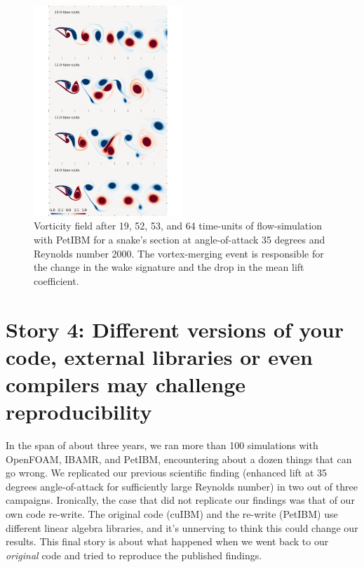 \documentclass[9pt,twocolumn,twoside]{article}
\begin{document}
\begin{figure}[t]
\centering
\includegraphics[width=0.5\textwidth]{./figures/petibm/petibm011_vorticityRe2000AoA35.pdf}
\caption{
Vorticity field after 19, 52, 53, and 64 time-units of flow-simulation with PetIBM for a snake's section at angle-of-attack 35 degrees and Reynolds number 2000.
The vortex-merging event is responsible for the change in the wake signature and the drop in the mean lift coefficient.}
\label{figure10}
\end{figure}



\section*{Story 4: Different versions of your code, external libraries or even compilers may challenge reproducibility}

In the span of about three years, we ran more than 100 simulations with OpenFOAM, IBAMR, and PetIBM, encountering about a dozen things that can go wrong. 
We replicated our previous scientific finding (enhanced lift at 35 degrees angle-of-attack for sufficiently large Reynolds number) in two out of three campaigns. 
Ironically, the case that did not replicate our findings was that of our own code re-write. 
The original code (cuIBM) and the re-write (PetIBM) use different linear algebra libraries, and it's unnerving to think this could change our results. 
This final story is about what happened when we went back to our \textit{original} code and tried to reproduce the published findings.
\end{document}
